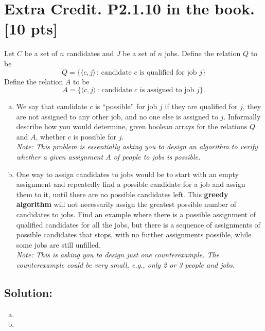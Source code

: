 \documentclass[12pt]{article}
\begin{document}
\newpage

\section*{\textbf{Extra Credit. P2.1.10 in the book.} [10 pts]}
Let $C$ be a set of $n$ candidates and $J$ be a set of $n$ jobs. Define the relation $Q$ to be 
$$Q = \{\langle c, j\rangle \,:\, \mbox{candidate $c$ is qualified for job $j$}\}$$
Define the relation $A$ to be 
$$ A = \{\langle c, j\rangle  \,:\, \mbox{candidate $c$ is assigned to job $j$}\} .$$
\begin{enumerate}[(a)]

    \item We say that candidate $c$ is “possible” for job $j$ if they are qualified for $j$, they are not assigned to any other job, and no one else is assigned to $j$. Informally describe how you would determine, given boolean arrays for the relations $Q$ and $A$, whether $c$ is possible for $j$.\\
    {\em \small Note:  This problem is essentially asking you to design an algorithm to  {\em verify} whether a given assignment $A$ of people to jobs is possible.}

    \item One way to assign candidates to jobs would be to start with an empty assignment and repeatedly find a possible candidate for a job and assign them to it, until there are no possible candidates left. This \textbf{greedy algorithm} will not necessarily assign the greatest possible number of candidates to jobs. Find an example where there is a possible assignment of qualified candidates for all the jobs, but there is a sequence of assignments of possible candidates that stops, with no further assignments possible, while some jobs are still unfilled.\\
     {\em \small Note:  This is asking you to design just  {\em one} counterexample.  The counterexample could be very small, e.g., only 2 or 3 people and jobs.}
 

    
\end{enumerate}

\subsection*{\textbf{Solution:}}

\begin{enumerate}[(a)]
    \item
    \item
\end{enumerate}
\end{document}
